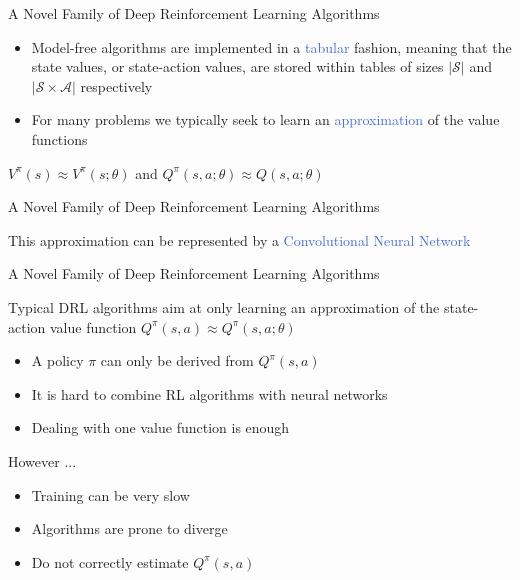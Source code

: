 \documentclass{beamer}
\begin{document}
\begin{frame}{A Novel Family of Deep Reinforcement Learning Algorithms}
	\begin{itemize}
		\item Model-free algorithms are implemented in a \textcolor{RoyalBlue}{tabular} fashion, meaning that the state values, or state-action values, are stored within tables of sizes $|\mathcal{S}|$ and $|\mathcal{S}\times\mathcal{A}|$ respectively

		\item For many problems we typically seek to learn an \textcolor{RoyalBlue}{approximation} of the value functions
	\end{itemize}
	
	\begin{center}

		$V^{\pi}(s)\approx V^\pi{(s;\theta)}$ and $Q^{\pi}(s,a;\theta)\approx Q(s,a;\theta)$
	\end{center}

\end{frame}


\begin{frame}{A Novel Family of Deep Reinforcement Learning Algorithms}

	This approximation can be represented by a \textcolor{RoyalBlue}{Convolutional Neural Network}

\end{frame}


\begin{frame}{A Novel Family of Deep Reinforcement Learning Algorithms}

	Typical DRL algorithms aim at only learning an approximation of the state-action value function $Q^{\pi}(s,a)\approx Q^{\pi}(s,a;\theta)$

	\begin{itemize}
		\item A policy $\pi$ can only be derived from $Q^{\pi}(s,a)$ 
		\item It is hard to combine RL algorithms with neural networks
		\item Dealing with one value function is enough
	\end{itemize}

	\bigskip

	However ...

	\begin{itemize}
		\item Training can be very slow 
		\item Algorithms are prone to diverge
		\item Do not correctly estimate $Q^{\pi}(s,a)$
	\end{itemize}

\end{frame}
\end{document}
